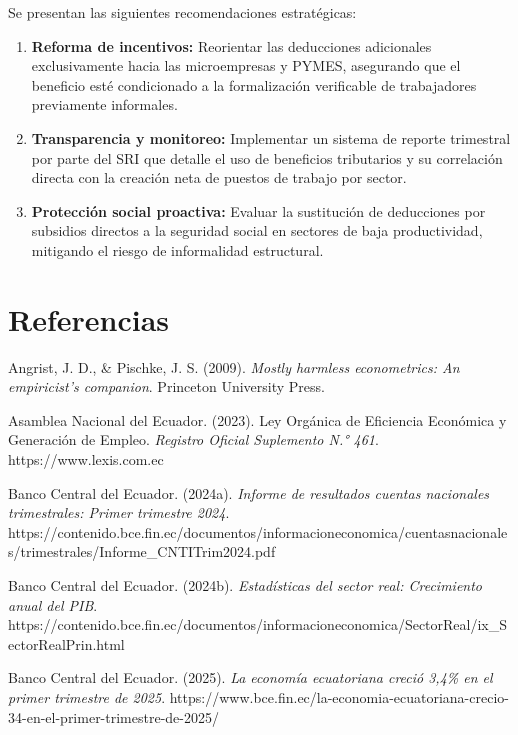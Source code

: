 \documentclass[12pt,spanish]{article}
\providecommand{\tightlist}{%
  \setlength{\itemsep}{0pt}\setlength{\parskip}{0pt}}
\begin{document}
Se presentan las siguientes recomendaciones estratégicas:

\begin{enumerate}
\def\labelenumi{\arabic{enumi})}
\tightlist
\item
  \textbf{Reforma de incentivos:} Reorientar las deducciones adicionales
  exclusivamente hacia las microempresas y PYMES, asegurando que el
  beneficio esté condicionado a la formalización verificable de
  trabajadores previamente informales.
\item
  \textbf{Transparencia y monitoreo:} Implementar un sistema de reporte
  trimestral por parte del SRI que detalle el uso de beneficios
  tributarios y su correlación directa con la creación neta de puestos
  de trabajo por sector.
\item
  \textbf{Protección social proactiva:} Evaluar la sustitución de
  deducciones por subsidios directos a la seguridad social en sectores
  de baja productividad, mitigando el riesgo de informalidad
  estructural.
\end{enumerate}

\section*{Referencias}\label{referencias}

\begingroup
\setlength{\parindent}{-1.27cm}
\setlength{\leftskip}{1.27cm}
\setlength{\parskip}{6pt}

Angrist, J. D., \& Pischke, J. S. (2009). \emph{Mostly harmless
econometrics: An empiricist's companion}. Princeton University Press.

Asamblea Nacional del Ecuador. (2023). Ley Orgánica de Eficiencia
Económica y Generación de Empleo. \emph{Registro Oficial Suplemento N.°
461}. https://www.lexis.com.ec

Banco Central del Ecuador. (2024a). \emph{Informe de resultados cuentas
nacionales trimestrales: Primer trimestre 2024}.
https://contenido.bce.fin.ec/documentos/informacioneconomica/cuentasnacionales/trimestrales/Informe\_CNTITrim2024.pdf

Banco Central del Ecuador. (2024b). \emph{Estadísticas del sector real:
Crecimiento anual del PIB}.
https://contenido.bce.fin.ec/documentos/informacioneconomica/SectorReal/ix\_SectorRealPrin.html

Banco Central del Ecuador. (2025). \emph{La economía ecuatoriana creció
3,4\% en el primer trimestre de 2025}.
https://www.bce.fin.ec/la-economia-ecuatoriana-crecio-34-en-el-primer-trimestre-de-2025/
\end{document}
